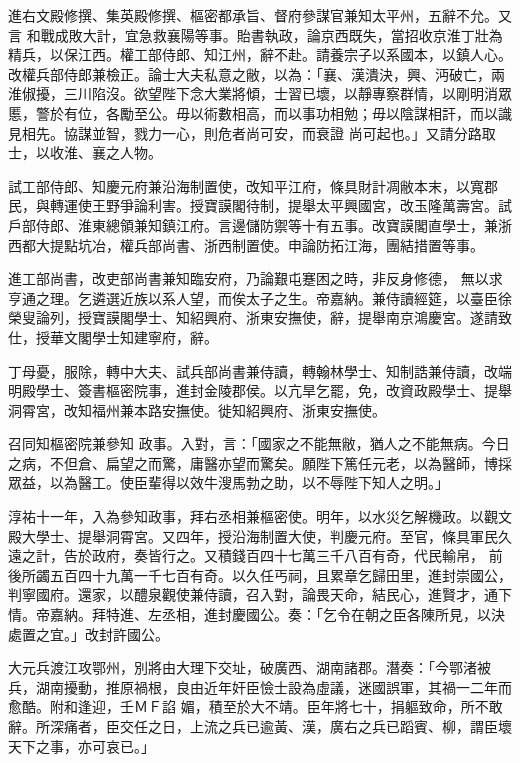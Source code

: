 \begin{pinyinscope}
 進右文殿修撰、集英殿修撰、樞密都承旨、督府參謀官兼知太平州，五辭不允。又言
 和戰成敗大計，宜急救襄陽等事。貽書執政，論京西既失，當招收京淮丁壯為精兵，以保江西。權工部侍郎、知江州，辭不赴。請養宗子以系國本，以鎮人心。改權兵部侍郎兼檢正。論士大夫私意之敝，以為：「襄、漢潰決，興、沔破亡，兩淮俶擾，三川陷沒。欲望陛下念大業將傾，士習已壞，以靜專察群情，以剛明消眾慝，警於有位，各勵至公。毋以術數相高，而以事功相勉；毋以陰謀相訐，而以識見相先。協謀並智，戮力一心，則危者尚可安，而衰證
 尚可起也。」又請分路取士，以收淮、襄之人物。



 試工部侍郎、知慶元府兼沿海制置使，改知平江府，條具財計凋敝本末，以寬郡民，與轉運使王野爭論利害。授寶謨閣待制，提舉太平興國宮，改玉隆萬壽宮。試戶部侍郎、淮東總領兼知鎮江府。言邊儲防禦等十有五事。改寶謨閣直學士，兼浙西都大提點坑冶，權兵部尚書、浙西制置使。申論防拓江海，團結措置等事。



 進工部尚書，改吏部尚書兼知臨安府，乃論艱屯蹇困之時，非反身修德，
 無以求亨通之理。乞遴選近族以系人望，而俟太子之生。帝嘉納。兼侍讀經筵，以臺臣徐榮叟論列，授寶謨閣學士、知紹興府、浙東安撫使，辭，提舉南京鴻慶宮。遂請致仕，授華文閣學士知建寧府，辭。



 丁母憂，服除，轉中大夫、試兵部尚書兼侍讀，轉翰林學士、知制誥兼侍讀，改端明殿學士、簽書樞密院事，進封金陵郡侯。以亢旱乞罷，免，改資政殿學士、提舉洞霄宮，改知福州兼本路安撫使。徙知紹興府、浙東安撫使。



 召同知樞密院兼參知
 政事。入對，言：「國家之不能無敝，猶人之不能無病。今日之病，不但倉、扁望之而驚，庸醫亦望而驚矣。願陛下篤任元老，以為醫師，博採眾益，以為醫工。使臣輩得以效牛溲馬勃之助，以不辱陛下知人之明。」



 淳祐十一年，入為參知政事，拜右丞相兼樞密使。明年，以水災乞解機政。以觀文殿大學士、提舉洞霄宮。又四年，授沿海制置大使，判慶元府。至官，條具軍民久遠之計，告於政府，奏皆行之。又積錢百四十七萬三千八百有奇，代民輸帛，
 前後所蠲五百四十九萬一千七百有奇。以久任丐祠，且累章乞歸田里，進封崇國公，判寧國府。還家，以醴泉觀使兼侍讀，召入對，論畏天命，結民心，進賢才，通下情。帝嘉納。拜特進、左丞相，進封慶國公。奏：「乞令在朝之臣各陳所見，以決處置之宜。」改封許國公。



 大元兵渡江攻鄂州，別將由大理下交址，破廣西、湖南諸郡。潛奏：「今鄂渚被兵，湖南擾動，推原禍根，良由近年奸臣憸士設為虛議，迷國誤軍，其禍一二年而愈酷。附和逢迎，壬ＭＦ諂
 媚，積至於大不靖。臣年將七十，捐軀致命，所不敢辭。所深痛者，臣交任之日，上流之兵已逾黃、漢，廣右之兵已蹈賓、柳，謂臣壞天下之事，亦可哀已。」




\end{pinyinscope}
